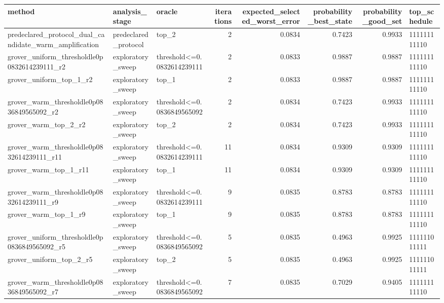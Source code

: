 \begin{tabular}{lllrrrrl}
\toprule
method & analysis\_stage & oracle & iterations & expected\_selected\_worst\_error & probability\_best\_state & probability\_good\_set & top\_schedule \\
\midrule
predeclared\_protocol\_dual\_candidate\_warm\_amplification & predeclared\_protocol & top\_2 & 2 & 0.0834 & 0.7423 & 0.9933 & 111111111110 \\
grover\_uniform\_thresholdle0p0832614239111\_r2 & exploratory\_sweep & threshold<=0.0832614239111 & 2 & 0.0833 & 0.9887 & 0.9887 & 111111111110 \\
grover\_uniform\_top\_1\_r2 & exploratory\_sweep & top\_1 & 2 & 0.0833 & 0.9887 & 0.9887 & 111111111110 \\
grover\_warm\_thresholdle0p0836849565092\_r2 & exploratory\_sweep & threshold<=0.0836849565092 & 2 & 0.0834 & 0.7423 & 0.9933 & 111111111110 \\
grover\_warm\_top\_2\_r2 & exploratory\_sweep & top\_2 & 2 & 0.0834 & 0.7423 & 0.9933 & 111111111110 \\
grover\_warm\_thresholdle0p0832614239111\_r11 & exploratory\_sweep & threshold<=0.0832614239111 & 11 & 0.0834 & 0.9309 & 0.9309 & 111111111110 \\
grover\_warm\_top\_1\_r11 & exploratory\_sweep & top\_1 & 11 & 0.0834 & 0.9309 & 0.9309 & 111111111110 \\
grover\_warm\_thresholdle0p0832614239111\_r9 & exploratory\_sweep & threshold<=0.0832614239111 & 9 & 0.0835 & 0.8783 & 0.8783 & 111111111110 \\
grover\_warm\_top\_1\_r9 & exploratory\_sweep & top\_1 & 9 & 0.0835 & 0.8783 & 0.8783 & 111111111110 \\
grover\_uniform\_thresholdle0p0836849565092\_r5 & exploratory\_sweep & threshold<=0.0836849565092 & 5 & 0.0835 & 0.4963 & 0.9925 & 111111011111 \\
grover\_uniform\_top\_2\_r5 & exploratory\_sweep & top\_2 & 5 & 0.0835 & 0.4963 & 0.9925 & 111111011111 \\
grover\_warm\_thresholdle0p0836849565092\_r7 & exploratory\_sweep & threshold<=0.0836849565092 & 7 & 0.0835 & 0.7029 & 0.9405 & 111111111110 \\
\bottomrule
\end{tabular}
